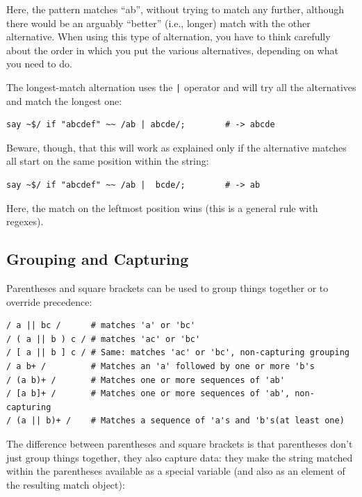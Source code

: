 Here, the pattern matches ``ab'', without trying to match 
any further, although there would be an arguably ``better'' 
(i.e., longer) match with the other alternative. When using 
this type of alternation, you have to think carefully about 
the order in which you put the various alternatives, 
depending on what you need to do.

The longest-match alternation uses the \verb'|' operator 
and will try all the alternatives and match the longest one:

\begin{verbatim}
say ~$/ if "abcdef" ~~ /ab | abcde/;        # -> abcde
\end{verbatim}
%

Beware, though, that this will work as explained only if 
the alternative matches all start on the same position 
within the string:

\begin{verbatim}
say ~$/ if "abcdef" ~~ /ab |  bcde/;        # -> ab
\end{verbatim}
%

Here, the match on the leftmost position wins (this is 
a general rule with regexes).


\subsection{Grouping and Capturing}

Parentheses and square brackets can be used to group 
things together or to override precedence:

\begin{verbatim}
/ a || bc /      # matches 'a' or 'bc'
/ ( a || b ) c / # matches 'ac' or 'bc'
/ [ a || b ] c / # Same: matches 'ac' or 'bc', non-capturing grouping
/ a b+ /         # Matches an 'a' followed by one or more 'b's
/ (a b)+ /       # Matches one or more sequences of 'ab'
/ [a b]+ /       # Matches one or more sequences of 'ab', non-capturing
/ (a || b)+ /    # Matches a sequence of 'a's and 'b's(at least one)
\end{verbatim}
%

The difference between parentheses and square brackets is 
that parentheses don't just group things together, 
they also capture data: they make the string matched within 
the parentheses available as a special variable (and also 
as an element of the resulting match object):

